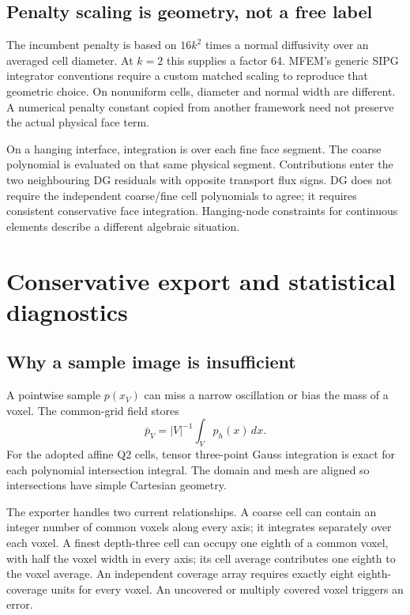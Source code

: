 \section{Penalty scaling is geometry, not a free label}
The incumbent penalty is based on $16k^2$ times a normal diffusivity over an averaged cell diameter. At $k=2$ this supplies a factor 64. MFEM's generic SIPG integrator conventions require a custom matched scaling to reproduce that geometric choice. On nonuniform cells, diameter and normal width are different. A numerical penalty constant copied from another framework need not preserve the actual physical face term.

On a hanging interface, integration is over each fine face segment. The coarse polynomial is evaluated on that same physical segment. Contributions enter the two neighbouring DG residuals with opposite transport flux signs. DG does not require the independent coarse/fine cell polynomials to agree; it requires consistent conservative face integration. Hanging-node constraints for continuous elements describe a different algebraic situation.

\chapter{Conservative export and statistical diagnostics}
\section{Why a sample image is insufficient}
A pointwise sample $p(x_V)$ can miss a narrow oscillation or bias the mass of a voxel. The common-grid field stores
\begin{equation}
 \bar p_V=|V|^{-1}\int_Vp_h(x)\,dx.
\end{equation}
For the adopted affine Q2 cells, tensor three-point Gauss integration is exact for each polynomial intersection integral. The domain and mesh are aligned so intersections have simple Cartesian geometry.

The exporter handles two current relationships. A coarse cell can contain an integer number of common voxels along every axis; it integrates separately over each voxel. A finest depth-three cell can occupy one eighth of a common voxel, with half the voxel width in every axis; its cell average contributes one eighth to the voxel average. An independent coverage array requires exactly eight eighth-coverage units for every voxel. An uncovered or multiply covered voxel triggers an error.

